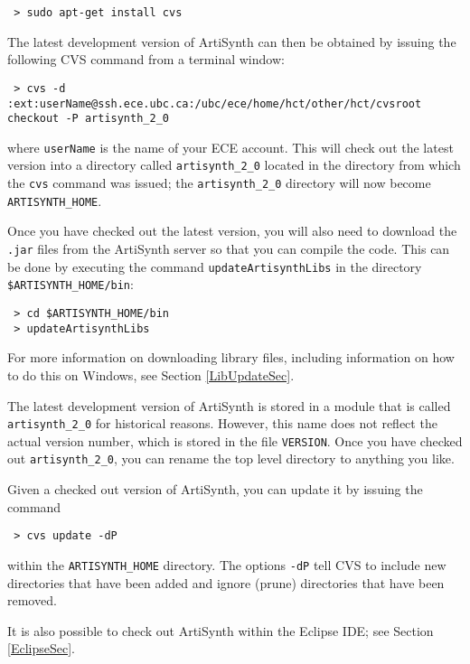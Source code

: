 \documentclass{article}
\begin{document}
\begin{verbatim}
 > sudo apt-get install cvs
\end{verbatim}

The latest development version of ArtiSynth can then be obtained by
issuing the following CVS command from a terminal window:

\begin{verbatim}
 > cvs -d :ext:userName@ssh.ece.ubc.ca:/ubc/ece/home/hct/other/hct/cvsroot checkout -P artisynth_2_0
\end{verbatim}

where {\tt userName} is the name of your ECE account. This will check
out the latest version into a directory called {\tt artisynth\_2\_0} located
in the directory from which the {\tt cvs} command was issued; the
{\tt artisynth\_2\_0} directory will now become {\tt ARTISYNTH\_HOME}.

Once you have checked out the latest version, you will also need to
download the {\tt .jar} files from the ArtiSynth server so that you
can compile the code. This can be done by executing the
command {\tt updateArtisynthLibs} in the directory {\tt
\$ARTISYNTH\_HOME/bin}:

\begin{verbatim}
 > cd $ARTISYNTH_HOME/bin
 > updateArtisynthLibs
\end{verbatim}

For more information on downloading library files, including
information on how to do this on Windows, see Section
\ref{LibUpdateSec}.

The latest development version of ArtiSynth is stored in a module that
is called {\tt artisynth\_2\_0} for historical reasons. However, this
name does not reflect the actual version number, which is stored
in the file {\tt VERSION}. Once you have checked out {\tt artisynth\_2\_0},
you can rename the top level directory to anything you like.

Given a checked out version of ArtiSynth, you can update it by issuing
the command

\begin{verbatim}
 > cvs update -dP
\end{verbatim}

within the {\tt ARTISYNTH\_HOME} directory. The options {\tt -dP} tell CVS to
include new directories that have been added and ignore (prune)
directories that have been removed.

It is also possible to check out ArtiSynth within the Eclipse IDE; see
Section \ref{EclipseSec}.
\end{document}
